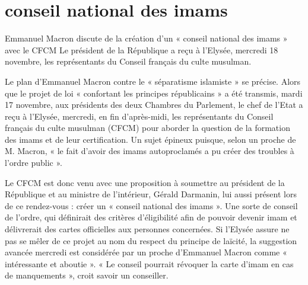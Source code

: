 \ei 
   
 



 

\newpage

\section*{conseil national des imams }


Emmanuel Macron discute de la création d’un « conseil national des imams » avec le CFCM
Le président de la République a reçu à l’Elysée, mercredi 18 novembre, les représentants du Conseil français du culte musulman. 

Le plan d’Emmanuel Macron contre le « séparatisme islamiste » se précise. Alors que le projet de loi « confortant les principes républicains » a été transmis, mardi 17 novembre, aux présidents des deux Chambres du Parlement, le chef de l’Etat a reçu à l’Elysée, mercredi, en fin d’après-midi, les représentants du Conseil français du culte musulman (CFCM) pour aborder la question de la formation des imams et de leur certification. Un sujet épineux puisque, selon un proche de M. Macron, « le fait d’avoir des imams autoproclamés a pu créer des troubles à l’ordre public ».

Le CFCM est donc venu avec une proposition à soumettre au président de la République et au ministre de l’intérieur, Gérald Darmanin, lui aussi présent lors de ce rendez-vous : créer un « conseil national des imams ». Une sorte de conseil de l’ordre, qui définirait des critères d’éligibilité afin de pouvoir devenir imam et délivrerait des cartes officielles aux personnes concernées. Si l’Elysée assure ne pas se mêler de ce projet au nom du respect du principe de laïcité, la suggestion avancée mercredi est considérée par un proche d’Emmanuel Macron comme « intéressante et aboutie ». « Le conseil pourrait révoquer la carte d’imam en cas de manquements », croit savoir un conseiller.
